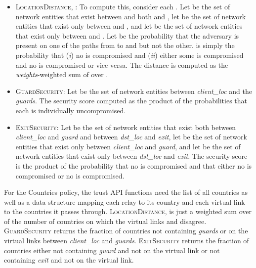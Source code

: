 \documentclass[conference]{styles/IEEEtran}
\newcommand{\compactify}{\settowidth{\labelsep}{o} \settowidth{\labelwidth}{o} \settowidth{\labelindent}{o}}
\begin{document}
\begin{itemize}[\compactify]
\item \textsc{LocationDistance}, : To compute
    this, consider each . Let  be the set of network entities that exist
    between  and both  and , let  be the set of network
    entities that exist only between  and , and let  be the set of
    network entities that exist only between  and . Let  be the probability
    that the adversary is present on
    one of the paths from  to  and  but not the other.  is simply the
    probability that (\emph{i}) no  is compromised and (\emph{ii}) either some 
    is compromised and no  is compromised or vice versa. The distance is computed as the
    \textit{weights}-weighted sum of  over .
    
\item \textsc{GuardSecurity}: Let  be the set of network
    entities between \textit{client\_loc} and the \textit{guards}. The security score computed as
    the product of the probabilities that each  is individually uncompromised.
    
\item \textsc{ExitSecurity}: Let  be the set of network entities that exist both between
    \textit{client\_loc} and \textit{guard} and between \textit{dst\_loc} and \textit{exit}, let
     be the set of network entities that exist only between \textit{client\_loc} and
    \textit{guard}, and let  be the set of network entities that exist only between
    \textit{dst\_loc} and \textit{exit}. The security score is the product of the probability that
    no  is compromised and that either no  is compromised or no  is
    compromised.
\end{itemize}

For the \textsf{Countries} policy, the trust API functions need the list of all countries as well
as a data structure mapping each relay to its country and each virtual link to the countries it
passes through.
\textsc{LocationDistance}, 
is just a weighted sum over  of the number of countries on which the virtual
links  and  disagree.
\textsc{GuardSecurity} returns the fraction of countries
not containing \textit{guards} or on the virtual links between \textit{client\_loc} and
\textit{guards}.
\textsc{ExitSecurity}
returns the fraction of countries either not containing \textit{guard} and not on the
 virtual link or not containing \textit{exit} and not on the
 virtual link.
\end{document}
